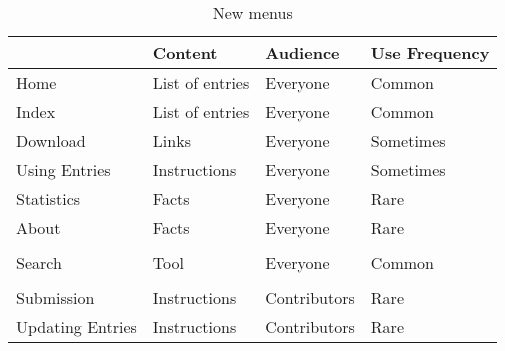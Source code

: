 \documentclass[bsc,frontabs,oneside,singlespacing,parskip,deptreport,logo]{infthesis}
\begin{document}
\begin{table}[h]
\centering
\begin{tabular}{llll}
\hline
\multicolumn{1}{|l|}{} & \multicolumn{1}{l|}{\textbf{Content}} & \multicolumn{1}{l|}{\textbf{Audience}} & \multicolumn{1}{l|}{\textbf{Use Frequency}} \\ \hline
\multicolumn{1}{|l|}{Home}                   & \multicolumn{1}{l|}{List of entries}  & \multicolumn{1}{l|}{Everyone}          & \multicolumn{1}{l|}{Common}                 \\ \hline
\multicolumn{1}{|l|}{Index}                  & \multicolumn{1}{l|}{List of entries}  & \multicolumn{1}{l|}{Everyone}          & \multicolumn{1}{l|}{Common}                 \\ \hline
\multicolumn{1}{|l|}{Download}               & \multicolumn{1}{l|}{Links}            & \multicolumn{1}{l|}{Everyone}          & \multicolumn{1}{l|}{Sometimes}              \\ \hline
\multicolumn{1}{|l|}{Using Entries}          & \multicolumn{1}{l|}{Instructions}     & \multicolumn{1}{l|}{Everyone}          & \multicolumn{1}{l|}{Sometimes}              \\ \hline
\multicolumn{1}{|l|}{Statistics}             & \multicolumn{1}{l|}{Facts}            & \multicolumn{1}{l|}{Everyone}          & \multicolumn{1}{l|}{Rare}                   \\ \hline
\multicolumn{1}{|l|}{About}                  & \multicolumn{1}{l|}{Facts}            & \multicolumn{1}{l|}{Everyone}          & \multicolumn{1}{l|}{Rare}                   \\ \hline
                                             &                                       &                                        &                                             \\ \hline
\multicolumn{1}{|l|}{Search}                 & \multicolumn{1}{l|}{Tool}             & \multicolumn{1}{l|}{Everyone}          & \multicolumn{1}{l|}{Common}                 \\ \hline
                                             &                                       &                                        &                                             \\ \hline
\multicolumn{1}{|l|}{Submission}             & \multicolumn{1}{l|}{Instructions}     & \multicolumn{1}{l|}{Contributors}      & \multicolumn{1}{l|}{Rare}                   \\ \hline
\multicolumn{1}{|l|}{Updating Entries}       & \multicolumn{1}{l|}{Instructions}     & \multicolumn{1}{l|}{Contributors}      & \multicolumn{1}{l|}{Rare}                   \\ \hline
\end{tabular}
\caption{New menus}
\label{newMenuOrder}
\end{table}
\end{document}
